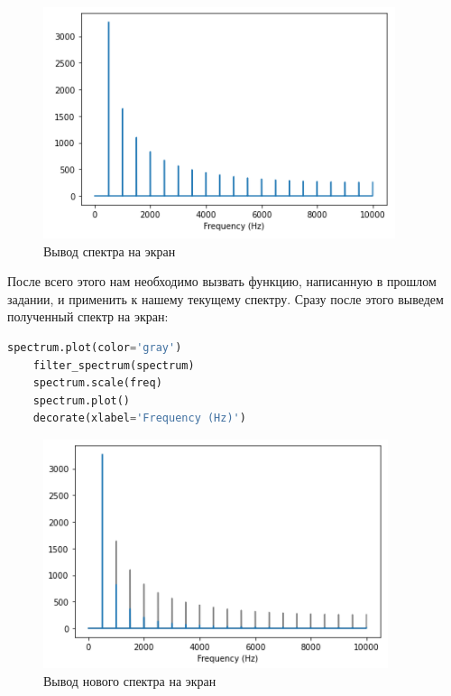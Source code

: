 \documentclass[a4paper]{article}
\begin{document}
            \begin{figure}[H]
                \centering
                \includegraphics[width=\textwidth]{ex_6_sawtooth_spectrum.png}
                \caption{Вывод спектра на экран}
                \label{fig:ex_6_sawtooth_spectrum}
            \end{figure}
            
            После всего этого нам необходимо вызвать функцию, написанную в прошлом задании, и применить к нашему текущему спектру. Сразу после этого выведем полученный спектр на экран:
            
\begin{lstlisting}[language=Python, caption= Вызов функции и вывод нового спектра на экран]
    spectrum.plot(color='gray')
    filter_spectrum(spectrum)
    spectrum.scale(freq)
    spectrum.plot()
    decorate(xlabel='Frequency (Hz)')
\end{lstlisting}               
            
            \begin{figure}[H]
                \centering
                \includegraphics[width=\textwidth]{ex_6_sawtooth_spectrum_fun.png}
                \caption{Вывод нового спектра на экран}
                \label{fig:ex_6_sawtooth_spectrum_fun}
            \end{figure}
            
\end{document}
